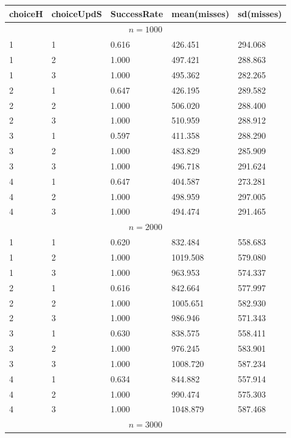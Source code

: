 \documentclass[11pt,a4paper,draft]{article}
\begin{document}
\begin{description}
	\begin{figure}[!h]
		\centering
		\begin{tabular}{lllll}
			\hline \hline 
			choiceH & choiceUpdS & SuccessRate & mean(misses) & sd(misses) \\
			\hline \hline 
			\multicolumn{5}{c}{$n = 1000$} \\ 
			\hline 
			1 & 1 &  0.616 & 426.451 & 294.068 \\
			1 & 2 &  1.000 & 497.421 & 288.863 \\
			1 & 3 &  1.000 & 495.362 & 282.265 \\
			\hline 
			2 & 1 &  0.647 & 426.195 & 289.582 \\
			2 & 2 &  1.000 & 506.020 & 288.400 \\
			2 & 3 &  1.000 & 510.959 & 288.912 \\
			\hline 
			3 & 1 &  0.597 & 411.358 & 288.290 \\
			3 & 2 &  1.000 & 483.829 & 285.909 \\
			3 & 3 &  1.000 & 496.718 & 291.624 \\
			\hline 
			4 & 1 &  0.647 & 404.587 & 273.281 \\
			4 & 2 &  1.000 & 498.959 & 297.005 \\
			4 & 3 &  1.000 & 494.474 & 291.465 \\
			\hline 
			\hline 
			\multicolumn{5}{c}{$n = 2000$} \\ 
			\hline 
			1 & 1 &  0.620 & 832.484 & 558.683 \\
			1 & 2 &  1.000 & 1019.508 & 579.080 \\
			1 & 3 &  1.000 & 963.953 & 574.337 \\
			\hline 
			2 & 1 &  0.616 & 842.664 & 577.997 \\
			2 & 2 &  1.000 & 1005.651 & 582.930 \\
			2 & 3 &  1.000 & 986.946 & 571.343 \\
			\hline 
			3 & 1 &  0.630 & 838.575 & 558.411 \\
			3 & 2 &  1.000 & 976.245 & 583.901 \\
			3 & 3 &  1.000 & 1008.720 & 587.234 \\
			\hline 
			4 & 1 &  0.634 & 844.882 & 557.914 \\
			4 & 2 &  1.000 & 990.474 & 575.303 \\
			4 & 3 &  1.000 & 1048.879 & 587.468 \\
			\hline 
			\hline 
			\multicolumn{5}{c}{$n = 3000$} \\ 
			\hline 

\end{tabular}
\end{figure}
\end{description}
\end{document}
